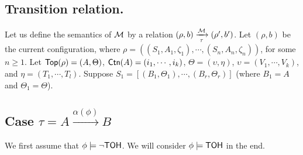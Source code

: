 \subsection*{Transition relation.} 
Let us define the semantics of ${\mathcal{M} }$ by a relation $(\rho, b) \xrightarrow[\tau]{{\mathcal{M} }} (\rho', b')$.
Let $(\rho,b)$ be the current configuration, where $\rho = ((S_1, A_1, \zeta_1), \cdots, (S_n, A_n, \zeta_n))$,
for some $n \ge 1$. 
Let ${\sf Top}(\rho) = (A, \Theta)$, 
${\sf Ctn}(A) = (i_1, \cdots, i_k)$, 
$\Theta = (\upsilon, \eta)$, $\upsilon = (V_1, \cdots, V_k)$, and $\eta = (T_1, \cdots, T_l)$.  
Suppose $S_1 = [(B_1, \Theta_1), \cdots, (B_r, \Theta_r)]$ (where $B_1 = A$ and $\Theta_1 = \Theta$). 
\subsection{Case $\tau = A\xrightarrow{\alpha(\phi)}B$}
\smallskip

We first assume that $\phi \models \neg {\sf TOH}$. We will consider $\phi \models {\sf TOH}$ in the end. 


